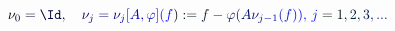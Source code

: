 \documentclass[12pt]{article}
\begin{document}
\makeatletter
\renewcommand*{\@textcolor}[3]{%
  \protect\leavevmode
  \begingroup
    \color#1{#2}#3%
  \endgroup
}
\makeatother
\begin{displaymath}
\mathcolor[RGB]{0,0,15}{\nu} _ { \mathcolor[RGB]{0,0,30}{0} } \mathcolor[RGB]{0,0,45}{=} \mathcolor[RGB]{0,0,60}{\Id} \mathcolor[RGB]{0,0,75}{,} \quad \mathcolor[RGB]{0,0,90}{\nu} _ { \mathcolor[RGB]{0,0,105}{j} } \mathcolor[RGB]{0,0,120}{=} \mathcolor[RGB]{0,0,135}{\nu} _ { \mathcolor[RGB]{0,0,150}{j} } \mathcolor[RGB]{0,0,165}{[} \mathcolor[RGB]{0,0,180}{A} \mathcolor[RGB]{0,0,195}{,} \mathcolor[RGB]{0,0,210}{\varphi} \mathcolor[RGB]{0,0,225}{]} \mathcolor[RGB]{0,0,240}{(} \mathcolor[RGB]{0,0,255}{f} \mathcolor[RGB]{0,15,0}{)} \mathcolor[RGB]{0,15,15}{:} \mathcolor[RGB]{0,15,30}{=} \mathcolor[RGB]{0,15,45}{f} \mathcolor[RGB]{0,15,60}{-} \mathcolor[RGB]{0,15,75}{\varphi} \mathcolor[RGB]{0,15,90}{(} \mathcolor[RGB]{0,15,105}{A} \mathcolor[RGB]{0,15,120}{\nu} _ { \mathcolor[RGB]{0,15,135}{j} \mathcolor[RGB]{0,15,150}{-} \mathcolor[RGB]{0,15,165}{1} } \mathcolor[RGB]{0,15,180}{(} \mathcolor[RGB]{0,15,195}{f} \mathcolor[RGB]{0,15,210}{)} \mathcolor[RGB]{0,15,225}{)} \mathcolor[RGB]{0,15,240}{,} \, \mathcolor[RGB]{0,15,255}{j} \mathcolor[RGB]{0,30,0}{=} \mathcolor[RGB]{0,30,15}{1} \mathcolor[RGB]{0,30,30}{,} \mathcolor[RGB]{0,30,45}{2} \mathcolor[RGB]{0,30,60}{,} \mathcolor[RGB]{0,30,75}{3} \mathcolor[RGB]{0,30,90}{,} \mathcolor[RGB]{0,30,105}{.} \mathcolor[RGB]{0,30,120}{.} \mathcolor[RGB]{0,30,135}{.}
\end{displaymath}
\end{document}
